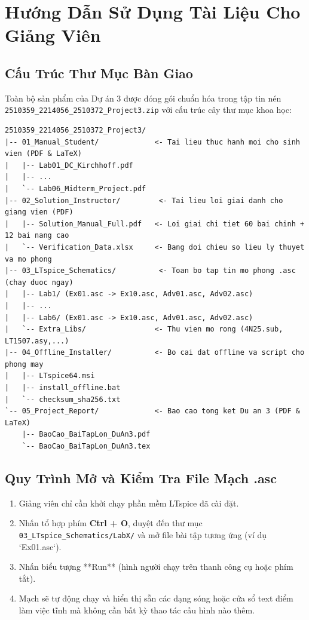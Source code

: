 \documentclass[12pt,a4paper]{report}
\begin{document}
\chapter{Hướng Dẫn Sử Dụng Tài Liệu Cho Giảng Viên}

\section{Cấu Trúc Thư Mục Bàn Giao}
Toàn bộ sản phẩm của Dự án 3 được đóng gói chuẩn hóa trong tập tin nén \texttt{2510359\_2214056\_2510372\_Project3.zip} với cấu trúc cây thư mục khoa học:
\begin{verbatim}
2510359_2214056_2510372_Project3/
|-- 01_Manual_Student/             <- Tai lieu thuc hanh moi cho sinh vien (PDF & LaTeX)
|   |-- Lab01_DC_Kirchhoff.pdf
|   |-- ...
|   `-- Lab06_Midterm_Project.pdf
|-- 02_Solution_Instructor/         <- Tai lieu loi giai danh cho giang vien (PDF)
|   |-- Solution_Manual_Full.pdf   <- Loi giai chi tiet 60 bai chinh + 12 bai nang cao
|   `-- Verification_Data.xlsx     <- Bang doi chieu so lieu ly thuyet va mo phong
|-- 03_LTspice_Schematics/          <- Toan bo tap tin mo phong .asc (chay duoc ngay)
|   |-- Lab1/ (Ex01.asc -> Ex10.asc, Adv01.asc, Adv02.asc)
|   |-- ...
|   |-- Lab6/ (Ex01.asc -> Ex10.asc, Adv01.asc, Adv02.asc)
|   `-- Extra_Libs/                <- Thu vien mo rong (4N25.sub, LT1507.asy,...)
|-- 04_Offline_Installer/          <- Bo cai dat offline va script cho phong may
|   |-- LTspice64.msi
|   |-- install_offline.bat
|   `-- checksum_sha256.txt
`-- 05_Project_Report/             <- Bao cao tong ket Du an 3 (PDF & LaTeX)
    |-- BaoCao_BaiTapLon_DuAn3.pdf
    `-- BaoCao_BaiTapLon_DuAn3.tex
\end{verbatim}

\section{Quy Trình Mở và Kiểm Tra File Mạch .asc}
\begin{enumerate}
    \item Giảng viên chỉ cần khởi chạy phần mềm LTspice đã cài đặt.
    \item Nhấn tổ hợp phím \textbf{Ctrl + O}, duyệt đến thư mục \texttt{03\_LTspice\_Schematics/LabX/} và mở file bài tập tương ứng (ví dụ `Ex01.asc`).
    \item Nhấn biểu tượng **Run** (hình người chạy trên thanh công cụ hoặc phím tắt).
    \item Mạch sẽ tự động chạy và hiển thị sẵn các dạng sóng hoặc cửa sổ text điểm làm việc tĩnh mà không cần bất kỳ thao tác cấu hình nào thêm.
\end{enumerate}
\end{document}
